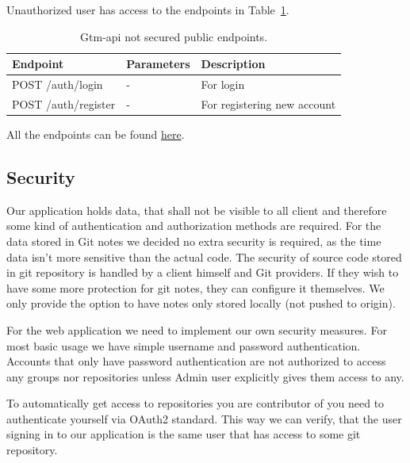 Unauthorized user has access to the endpoints in Table~\ref{tab:gtm-api-endpoints-public}.
\begin{table}[H]
    \centering
    \begin{tabular}{ | p{5cm} | p{4cm} | p{5cm} |}
        \hline
        Endpoint & Parameters & Description\\
        \hline
        POST /auth/login & - & For login \\
        \hline
        POST /auth/register & - & For registering new account \\
        \hline
    \end{tabular}
    \caption{Gtm-api not secured public endpoints.}
    \label{tab:gtm-api-endpoints-public}
\end{table}

All the endpoints can be found \href{https://cs.ttu.ee/services/gtm/api/swagger/index.html}{here}.

\subsection{Security}\label{subsec:scurity}
Our application holds data, that shall not be visible to all client and therefore some kind of authentication and authorization methods are required.
For the data stored in Git notes we decided no extra security is required, as the time data isn't more sensitive than the actual code.
The security of source code stored in git repository is handled by a client himself and Git providers.
If they wish to have some more protection for git notes, they can configure it themselves.
We only provide the option to have notes only stored locally (not pushed to origin).

For the web application we need to implement our own security measures.
For most basic usage we have simple username and password authentication.
Accounts that only have password authentication are not authorized to access any groups nor repositories unless Admin user
explicitly gives them access to any.

To automatically get access to repositories you are contributor of you need to authenticate yourself via OAuth2 standard.
This way we can verify, that the user signing in to our application is the same user that has access to some git repository.

